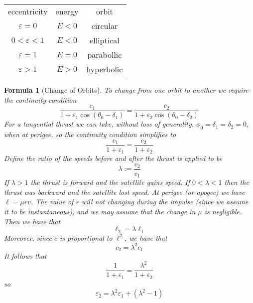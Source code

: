 \documentclass[12pt]{article}
\newtheorem{for}[thm]{Formula}
\theoremstyle{definition}
\theoremstyle{remark}
\numberwithin{equation}{section}
\begin{document}
\begin{table}[H]
        \centering
        \begin{tabular}{c|c|c}
                eccentricity & energy & orbit \\
                $\varepsilon = 0$ & $E < 0$ & circular \\
                $0 < \varepsilon < 1$ & $E < 0$ & elliptical \\
                $\varepsilon = 1$ & $E = 0$ & parabollic \\
                $ \varepsilon > 1$ & $E > 0$ & hyperbolic
        \end{tabular}
\end{table}


\begin{for}[Change of Orbits]
        To change from one orbit to another we require the continuity condition \begin{equation}
                \frac{c_1}{1+\varepsilon_1\cos(\theta_0 - \delta_1)} = \frac{c_2}{1+\varepsilon_2\cos(\theta_0 - \delta_2)}
        \end{equation}
        For a tangential thrust we can take, without loss of generality, $\phi_0 = \delta_1 = \delta_2 = 0$, when at perigee, so the continuity condition simplifies to \begin{equation}
                \frac{c_1}{1+\varepsilon_1} = \frac{c_2}{1+\varepsilon_2}
        \end{equation}
        Define the ratio of the speeds before and after the thrust is applied to be \begin{equation}
                \lambda := \frac{v_2}{v_1}
        \end{equation}
        If $\lambda > 1$ the thrust is forward and the satellite gains speed. If $0 < \lambda < 1$ then the thrust was backward and the satellite lost speed. At perigee (or apogee) we have $\ell = \mu rv$. The value of $r$ will not changing during the impulse (since we assume it to be instantaneous), and we may assume that the change in $\mu$ is negligible. Then we have that \begin{equation}
                \ell_2 = \lambda \ell_1
        \end{equation}
        Moreover, since $c$ is proportional to $\ell^2$, we have that\begin{equation}
                c_2 = \lambda^2 c_1
        \end{equation}
        It follows that \begin{equation}
                \frac{1}{1+\varepsilon_1} = \frac{\lambda^2}{1+\varepsilon_2}
        \end{equation}
        so \begin{equation}
                \varepsilon_2 = \lambda^2\varepsilon_1 + (\lambda^2 - 1)
        \end{equation}
\end{for}
\end{document}
